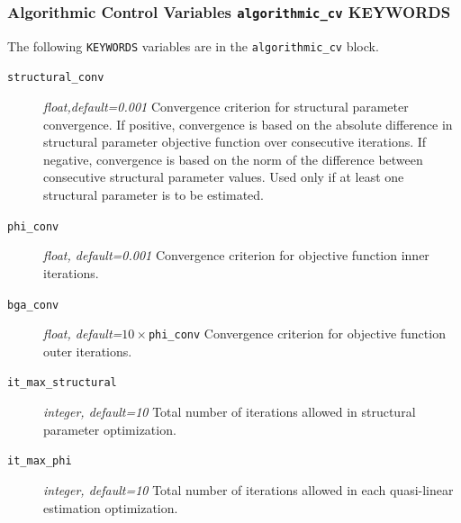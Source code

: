 \documentclass[11pt,oneside,onecolumn]{usgsreport}
\begin{document}
\begin{appendix}
\subsubsection{Algorithmic Control Variables \texttt{algorithmic\_cv} KEYWORDS}

The following \texttt{KEYWORDS} variables are in the \texttt{algorithmic\_cv}
block.
\begin{description}
\item [{\texttt{structural\_conv}}] \emph{float,default=0.001} Convergence
criterion for structural parameter convergence. If positive, convergence
is based on the absolute difference in structural parameter objective
function over consecutive iterations. If negative, convergence is
based on the norm of the difference between consecutive structural
parameter values. Used only if at least one structural parameter is
to be estimated. 
\item [{\texttt{phi\_conv}}] \emph{float, default=0.001 }Convergence criterion
for objective function inner iterations. 
\item [{\texttt{bga\_conv}}] \emph{float, default=$10\times$}\texttt{phi\_conv}\emph{
}Convergence criterion for objective function outer iterations. 
\item [{\texttt{it\_max\_structural}}] \emph{integer, default=10 }Total
number of iterations allowed in structural parameter optimization.

\item [{\texttt{it\_max\_phi}}] \emph{integer, default=10 }Total number
of iterations allowed in each quasi-linear estimation optimization.


\end{description}
\end{appendix}
\end{document}
